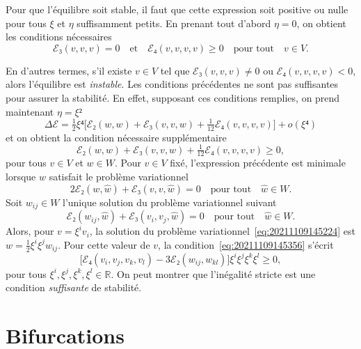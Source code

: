 \documentclass[12pt, final]{scrartcl}
\theoremstyle{definition}
\newcommand{\reals}{\mathbb{R}}
\begin{document}
Pour que l'équilibre soit stable, il faut que cette expression soit positive ou
nulle pour tous \(ξ\) et \(η\) suffisamment petits. En prenant tout d'abord
\(η = 0\), on obtient les conditions nécessaires
\begin{equation}
  \label{eq:20211108164416}
  ℰ₃(v, v, v) = 0 \quad \text{et} \quad ℰ₄(v, v, v, v) \geq 0 \quad \text{pour tout} \quad v∈V.
\end{equation}

En d'autres termes, s'il existe \(v∈V\) tel que \(ℰ₃(v, v, v) \neq 0\) ou
\(ℰ₄(v, v, v, v) < 0\), alors l'équilibre est \emph{instable}. Les conditions
précédentes ne sont pas suffisantes pour assurer la stabilité. En effet,
supposant ces conditions remplies, on prend maintenant \(η = ξ²\)
\begin{equation}
  Δℰ = \tfrac{1}{2} ξ⁴ \bigl[ ℰ₂(w, w) + ℰ₃(v, v, w) + \tfrac{1}{12} ℰ₄(v, v, v, v) \bigr] + o(ξ⁴)
\end{equation}
et on obtient la condition nécessaire supplémentaire
\begin{equation}
  \label{eq:20211109145356}
  ℰ₂(w, w) + ℰ₃(v, v, w) + \tfrac{1}{12} ℰ₄(v, v, v, v) \geq 0,
\end{equation}
pour tous \(v∈V\) et \(w∈W\). Pour \(v∈V\) fixé, l'expression précédente est
minimale lorsque \(w\) satisfait le problème variationnel
\begin{equation}
  \label{eq:20211109145224}
  2ℰ₂(w, \hat{w}) +ℰ₃(v, v, \hat{w}) = 0 \quad \text{pour tout} \quad \hat{w}∈W.
\end{equation}
Soit \(w_{ij}∈W\) l'unique solution du problème variationnel suivant
\begin{equation}
  \label{eq:20220519164523}
  ℰ₂(w_{i j}, \hat{w})+ℰ₃(v_i, v_j, \hat{w}) = 0 \quad \text{pour tout} \quad \hat{w}∈W.
\end{equation}
Alors, pour \(v = ξ^i v_i\), la solution du problème
variationnel~\eqref{eq:20211109145224} est \(w = \tfrac{1}{2} ξ^i ξ^j
w_{ij}\). Pour cette valeur de \(v\), la condition~\eqref{eq:20211109145356}
s'écrit
\begin{equation}
  \bigl[ℰ₄(v_i, v_j, v_k, v_l) - 3ℰ₂(w_{ij}, w_{kl})\bigr] ξ^i ξ^j ξ^k ξ^l \geq 0,
\end{equation}
pour tous \(ξ^i, ξ^j, ξ^k, ξ^l∈\reals\). On peut montrer que l'inégalité stricte
est une condition \emph{suffisante} de
stabilité. 

\section{Bifurcations}
\end{document}

